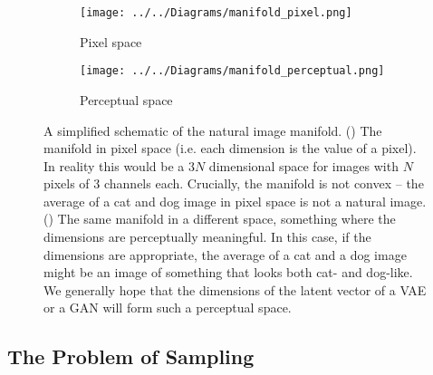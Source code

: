 \documentclass[10pt,a4paper]{article}
\begin{document}
\begin{figure}
	\centering
	\vspace{-3cm}	
	
    \begin{subfigure}{0.7\columnwidth}
        \centering
        \caption{Pixel space}
        \texttt{[image: ../../Diagrams/manifold\_pixel.png]} 
        \label{manifold:pixel}
    \end{subfigure}
    \vspace{1cm}
    
    \begin{subfigure}{0.7\columnwidth}
        \centering
        \caption{Perceptual space}
        \texttt{[image: ../../Diagrams/manifold\_perceptual.png]} 
        \label{manifold:perceptual}
    \end{subfigure}
  \caption{A simplified schematic of the natural image manifold. () The manifold in pixel space (i.e. each dimension is the value of a pixel). In reality this would be a $3N$ dimensional space for images with $N$ pixels of 3 channels each. Crucially, the manifold is not convex -- the average of a cat and dog image in pixel space is not a natural image. () The same manifold in a different space, something where the dimensions are perceptually meaningful. In this case, if the dimensions are appropriate, the average of a cat and a dog image might be an image of something that looks both cat- and dog-like. We generally hope that the dimensions of the latent vector of a VAE or a GAN will form such a perceptual space.}
  \label{manifold}
\end{figure}


\subsection{The Problem of Sampling}
\end{document}
